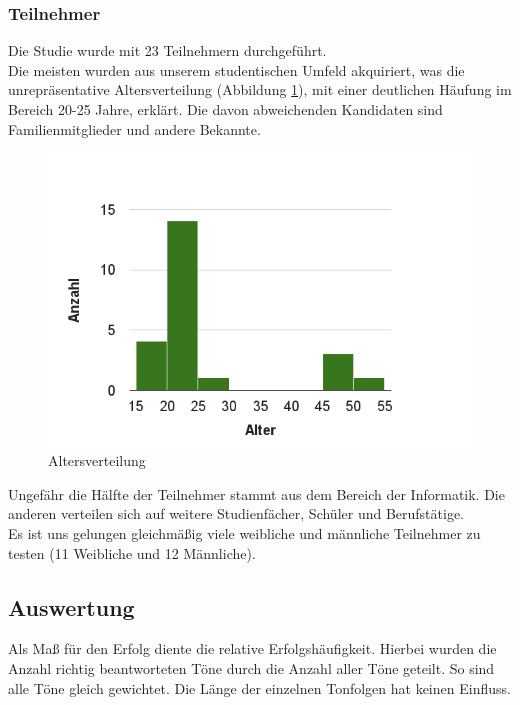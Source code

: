 \documentclass{acm_proc_article-sp}
\begin{document}
\subsubsection{Teilnehmer}
Die Studie wurde mit 23 Teilnehmern durchgeführt.\\
Die meisten wurden aus unserem studentischen Umfeld akquiriert, was die unrepräsentative Altersverteilung (Abbildung \ref{Alter}), mit einer deutlichen Häufung im Bereich 20-25 Jahre, erklärt. Die davon abweichenden Kandidaten sind Familienmitglieder und andere Bekannte.
\begin{figure}[h]
\includegraphics[width=1.0\linewidth]{Abbildungen/Altersverteilung.png}
\caption{Altersverteilung}
\label{Alter}
\end{figure}
Ungefähr die Hälfte der Teilnehmer stammt aus dem Bereich der Informatik. Die anderen verteilen sich auf weitere Studienfächer, Schüler und Berufstätige.\\
Es ist uns gelungen gleichmäßig viele weibliche und männliche Teilnehmer zu testen (11 Weibliche und 12 Männliche). 
\subsection{Auswertung}
Als Maß für den Erfolg diente die relative Erfolgshäufigkeit. Hierbei wurden die Anzahl richtig beantworteten Töne durch die Anzahl aller Töne geteilt. So sind alle Töne gleich gewichtet. Die Länge der einzelnen Tonfolgen hat keinen Einfluss.
\end{document}
